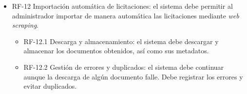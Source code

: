 \begin{itemize}
\begin{itemize}
	\end{itemize}
	\item RF-12 Importación automática de licitaciones: el sistema debe permitir al administrador importar de manera automática las licitaciones mediante \textit{web scraping}.
	\begin{itemize}
	\tightlist
		\item RF-12.1 Descarga y almacenamiento: el sistema debe descargar y almacenar los documentos obtenidos, así como sus metadatos.
		\item RF-12.2 Gestión de errores y duplicados: el sistema debe continuar aunque la descarga de algún documento falle. Debe registrar los errores y evitar duplicados.
	\end{itemize}
\end{itemize}

